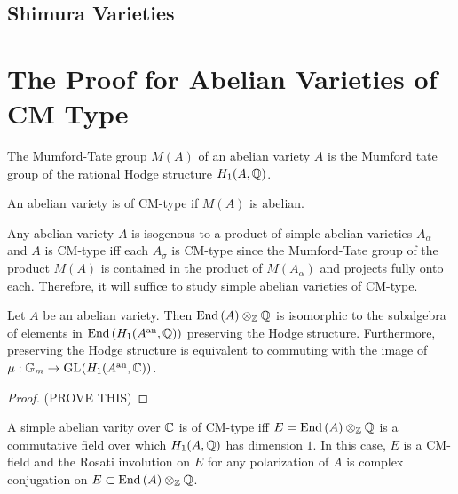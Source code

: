 \documentclass[12pt]{article}
\begin{document}
\subsection{Shimura Varieties}

\section{The Proof for Abelian Varieties of CM Type}

\begin{definition}
The Mumford-Tate group $M(A)$ of an abelian variety $A$ is the Mumford tate group of the rational Hodge structure $H_1(A, \mathbb{Q})$. 
\end{definition}

\begin{definition}
An abelian variety is of CM-type if $M(A)$ is abelian.  
\end{definition}

\begin{remark}
Any abelian variety $A$ is isogenous to a product of simple abelian varieties $A_\alpha$ and $A$ is CM-type iff each $A_\sigma$ is CM-type since the Mumford-Tate group of the product $M(A)$ is contained in the product of $M(A_\alpha)$ and projects fully onto each. Therefore, it will suffice to study simple abelian varieties of CM-type. 
\end{remark}

\begin{lemma}
Let $A$ be an abelian variety. Then $\text{End}\left( A \right) \otimes_{\mathbb{Z}} \mathbb{Q}$ is isomorphic to the subalgebra of elements in $\text{End}\left( H_1(A^{\mathrm{an}}, \mathbb{Q}) \right)$ preserving the Hodge structure. Furthermore, preserving the Hodge structure is equivalent to commuting with the image of $\mu : \mathbb{G}_m \to \mathrm{GL}_{}(H_1(A^{\mathrm{an}}, \mathbb{C}))$. 
\end{lemma}

\begin{proof}
(PROVE THIS)
\end{proof}

\begin{proposition}
A simple abelian varity over $\mathbb{C}$ is of CM-type iff $E = \text{End}\left( A \right) \otimes_{\mathbb{Z}} \mathbb{Q}$ is a commutative field over which $H_1(A, \mathbb{Q})$ has dimension $1$. In this case, $E$ is a CM-field and the Rosati involution on $E$ for any polarization of $A$ is complex conjugation on $E \subset \text{End}\left( A \right) \otimes_{\mathbb{Z}} \mathbb{Q}$. 
\end{proposition}
\end{document}
